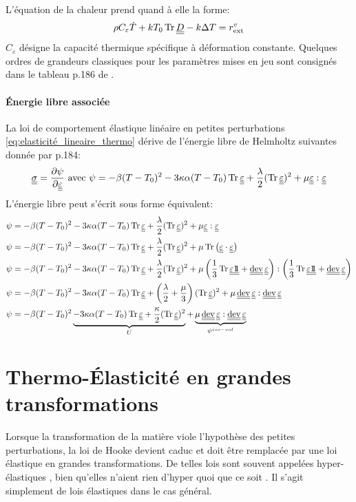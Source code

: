 \documentclass[10pt]{book}
\newcommand{\PsiVol}{U}
\begin{document}
\begin{appendices}
L'équation de la chaleur prend quand à elle la forme:
\begin{equation}
\rho C_{\varepsilon}\dot{T}+k T_{0}\tr\TD-k\Delta T=\PCaloVol
\label{eq:chaleur_HPP}
\end{equation}
$C_{\varepsilon}$ désigne la capacité thermique spécifique à déformation constante. Quelques ordres de grandeurs classiques pour les paramètres mises en jeu sont consignés dans le tableau p.186 de \cite{forest2015mecanique}.

\paragraph{Énergie libre associée}
La loi de comportement élastique linéaire en petites perturbations \eqref{eq:elasticité_lineaire_thermo} dérive de l'énergie libre de Helmholtz suivantes donnée par \citep{forest2015mecanique} p.184:
$$\SC=\dfrac{\partial \psi}{\partial \DefoHPP} \avec \psi =-\beta(T-T_{0})^{2}-3\BulkModulus\alpha(T-T_{0})\tr\DefoHPP+\dfrac{\lambda}{2}(\tr\DefoHPP)^{2}+\mu\DefoHPP:\DefoHPP$$
L'énergie libre peut s'écrit sous forme équivalent:
$$\begin{aligned}
\psi &=-\beta(T-T_{0})^{2}-3\BulkModulus\alpha(T-T_{0})\tr\DefoHPP+\dfrac{\lambda}{2}(\tr\DefoHPP)^{2}+\mu\DefoHPP:\DefoHPP\\
\psi &=-\beta(T-T_{0})^{2}-3\BulkModulus\alpha(T-T_{0})\tr\DefoHPP+\dfrac{\lambda}{2}(\tr\DefoHPP)^{2}+\mu\tr\left(\DefoHPP\cdot\DefoHPP\right)\\
\psi &=-\beta(T-T_{0})^{2}-3\BulkModulus\alpha(T-T_{0})\tr\DefoHPP+\dfrac{\lambda}{2}(\tr\DefoHPP)^{2}+\mu\pa{\dfrac{1}{3}\tr\DefoHPP\TU+\dev\DefoHPP}:\pa{\dfrac{1}{3}\tr\DefoHPP\TU+\dev\DefoHPP}\\
\psi &=-\beta(T-T_{0})^{2}-3\BulkModulus\alpha(T-T_{0})\tr\DefoHPP+\pa{\dfrac{\lambda}{2}+\dfrac{\mu}{3}}(\tr\DefoHPP)^{2}+\mu\dev\DefoHPP:\dev\DefoHPP\\
\psi &=-\beta(T-T_{0})^{2}\underbrace{-3\BulkModulus\alpha(T-T_{0})\tr\DefoHPP+\dfrac{\BulkModulus}{2}(\tr\DefoHPP)^{2}}_{\PsiVol}+\underbrace{\mu\dev\DefoHPP:\dev\DefoHPP}_{\psi ^{iso-vol}}\\
\end{aligned}$$
\section{Thermo-Élasticité en grandes transformations}\label{Section:Élasticité en grandes transformations}
Lorsque la transformation de la matière viole l'hypothèse des petites perturbations, la loi de Hooke devient caduc et doit être remplacée par une loi élastique en grandes transformations. De telles lois sont souvent appelées \og hyper-élastiques \fg{}, bien qu'elles n'aient rien \og d'hyper quoi que ce soit \fg{}. Il s'agit simplement de lois élastiques dans le cas général.

\end{appendices}
\end{document}
